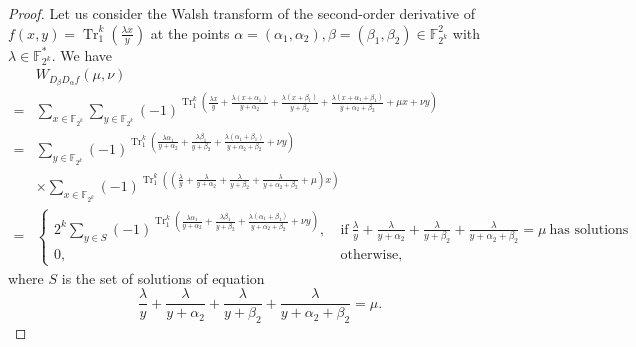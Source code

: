 \documentclass{article}
\newcommand{\F}{\mathbb{F}}
\newcommand{\0}{\textbf{0}}
\newcommand{\1}{\textbf{1}}
\newcommand{\TRACE}{\operatorname{Tr}_1^k}
\theoremstyle{plain}
\begin{document}
    \begin{proof}        
    Let us consider the Walsh transform of the second-order derivative of 
    $ f(x,y)=\TRACE\left(\frac{\lambda x}{y}\right) $ at the points 
    $ \alpha=(\alpha_1,\alpha_2),\beta=(\beta_1,\beta_2)\in\F_{2^k}^2 $ with $ \lambda\in\F_{2^k}^* $.
    We have 
    \begin{align*}\label{eq:secondordersum}
        &W_{D_{\beta}D_{\alpha}f}(\mu,\nu)\nonumber\\
        =&\sum_{x\in\F_{2^k}}\sum_{y\in\F_{2^k}}(-1)^{\TRACE\left(\frac{\lambda x}{y}+\frac{\lambda (x+\alpha_1)}{y+\alpha_2}+\frac{\lambda (x+\beta_1)}{y+\beta_2}+\frac{\lambda (x+\alpha_1+\beta_1)}{y+\alpha_2+\beta_2}+\mu x+\nu y\right)}\nonumber\\
        =&\sum_{y\in\F_{2^k}}(-1)^{\TRACE\left(\frac{\lambda\alpha_1}{y+\alpha_2}+\frac{\lambda\beta_1}{y+\beta_2}+\frac{\lambda(\alpha_1+\beta_1)}{y+\alpha_2+\beta_2}+\nu y\right)}\nonumber\\
        &\times \sum_{x\in\F_{2^k}}(-1)^{\TRACE\left(\left(\frac{\lambda}{y}+\frac{\lambda}{y+\alpha_2}+\frac{\lambda}{y+\beta_2}+\frac{\lambda}{y+\alpha_2+\beta_2}+\mu\right)x\right)}\nonumber\\
        =&\begin{cases}
            2^k\sum_{y\in S}(-1)^{\TRACE\left(\frac{\lambda\alpha_1}{y+\alpha_2}+\frac{\lambda\beta_1}{y+\beta_2}+\frac{\lambda(\alpha_1+\beta_1)}{y+\alpha_2+\beta_2}+\nu y\right)},&~\text{if}~\frac{\lambda}{y}+\frac{\lambda}{y+\alpha_2}+\frac{\lambda}{y+\beta_2}+\frac{\lambda}{y+\alpha_2+\beta_2}=\mu~\text{has solutions}\\
            0, &~\text{otherwise}, 
        \end{cases}
    \end{align*}
    where $ S $ is the set of solutions of equation 
    \begin{equation}\label{eq:coefficient}
        \frac{\lambda}{y}+\frac{\lambda}{y+\alpha_2}+\frac{\lambda}{y+\beta_2}+\frac{\lambda}{y+\alpha_2+\beta_2}=\mu.
    \end{equation}


\end{proof}
\end{document}

